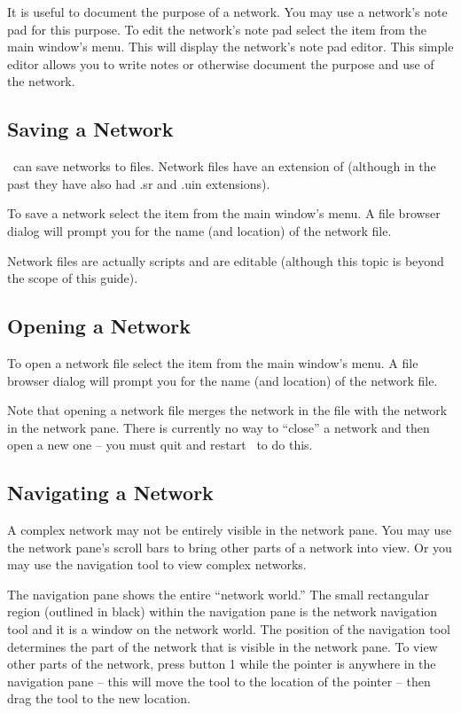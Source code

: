 It is useful to document the purpose of a network.  You may use a network's
note pad for this purpose.  To edit the network's note pad select the
 item from the main window's  menu.  This
will display the network's note pad editor.  This simple editor allows you
to write notes or otherwise document the purpose and use of the network.


\subsection{Saving a Network}
\label{sec:savenet}

\sr\ can save networks to files.  Network files have an extension of
 (although in the past they have also had .sr and .uin
extensions).  

To save a network select the  item from the main window's
 menu.  A file browser dialog will prompt you for the
name (and location) of the network file.

Network files are actually  scripts and
are editable (although this topic is beyond the scope of this guide).

\subsection{Opening a Network}
\label{sec:opennet}

To open a network file select the  item from the main
window's  menu.   A file browser dialog will prompt you for the
name (and location) of the network file.

Note that opening a network file merges the network in the file with the
network in the network pane.  There is currently no way to ``close'' a
network and then open a new one -- you must quit and restart \sr\ to do
this.

\subsection{Navigating a Network}
\label{sec:navnetwork}

A complex network may not be entirely visible in the network pane.  You may
use the network pane's scroll bars to bring other parts of a network into
view.  Or you may use the navigation tool to view complex networks.

The navigation pane shows the entire ``network world.''  The small
rectangular region (outlined in black) within the navigation pane is the
network navigation tool and it is a window on the network world.  The
position of the navigation tool determines the part of the network that is
visible in the network pane.  To view other parts of the network, press
button 1 while the pointer is anywhere in the navigation pane -- this will
move the tool to the location of the pointer --  then drag the tool to the
new location.


